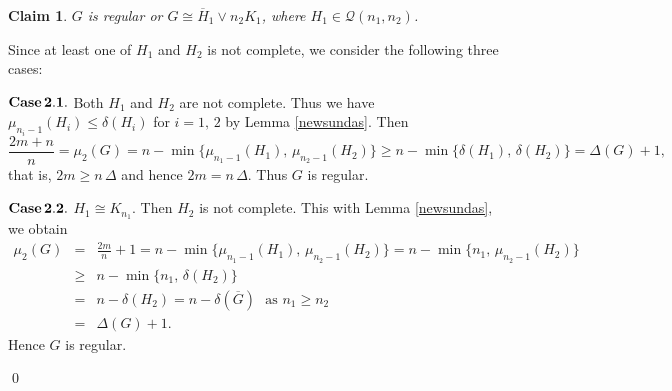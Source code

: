 \documentclass[12pt]{article}
\newtheorem{claim}{Claim}
\newenvironment{pf}{\medskip\noindent{Proof:  \hspace*{-.4cm}}
       \enspace}{\hfill \qed \newline \medskip}
\begin{document}
\begin{pf}
\begin{claim}\label{c2} $G$ is regular or  $G\cong \overline{H}_1\vee n_2K_1$, where $H_1\in \mathcal{Q}(n_1,n_2)$.
\end{claim}

\vspace*{3mm}

 Since at least one of $H_1$ and $H_2$ is not complete, we consider the following three cases:

\vspace*{2mm}

\noindent
${\bf Case\,2.1.}$ Both $H_1$ and $H_2$ are not complete. Thus we have $\mu_{n_i-1}(H_i)\leq\delta(H_i)$
 for $i=1,\,2$ by Lemma \ref{newsundas}. Then
    $$\frac{2m+n}{n}=\mu_2(G)=n-\min\Big\{\mu_{n_1-1}(H_1),\,\mu_{n_2-1}(H_2)\Big\}\geq n-\min\Big\{\delta(H_1),\,\delta(H_2)\Big\}=\Delta(G)+1,$$
that is, $2m\geq n\,\Delta$ and hence $2m=n\,\Delta$. Thus $G$ is regular.

 \vspace*{3mm}

\vspace*{2mm}

\noindent
${\bf Case\,2.2.}$ $H_1\cong K_{n_1}$. Then $H_2$ is not complete. This with Lemma \ref{newsundas}, we obtain
 \begin{eqnarray}
 \mu_2(G)&=&\frac{2m}{n}+1=n-\min\Big\{\mu_{n_1-1}(H_1),\,\mu_{n_2-1}(H_2)\Big\}=n-\min\Big\{n_1,\,\mu_{n_2-1}(H_2)\Big\}\nonumber\\[2mm]
 &\geq & n-\min\{n_1,\,\delta(H_2)\}\nonumber\\[2mm]
 &=&n-\delta(H_2) =n-\delta(\overline{G})~~~\mbox{as $n_1\geq n_2$}\nonumber\\[2mm]
 &=&\Delta(G)+1.\nonumber
 \end{eqnarray}
 Hence $G$ is regular.

 \vspace*{3mm}

\vspace*{2mm}


\end{pf}
\end{document}
